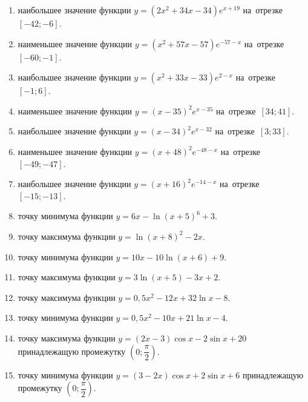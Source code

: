 \documentclass[a4paper,10pt]{article}
\begin{document}
\begin{enumerate}
\item {} наибольшее значение функции $y=\left(2x^2 +34x -34\right)e^{x+19}$ на~отрезке~$\left[-42;-6\right]$.

\item {} наименьшее значение функции $y=\left(x^2 +57x -57\right)e^{-57-x}$ на~отрезке~$\left[-60;-1\right]$.

\item {} наибольшее значение функции $y=\left(x^2 +33x -33\right)e^{2-x}$ на~отрезке~$\left[-1;6\right]$.

\item {} наименьшее значение функции $y=\left(x-35\right)^2e^{x-35}$ на~отрезке~$\left[34;41\right]$.

\item {} наибольшее значение функции $y=\left(x-34\right)^2e^{x-32}$ на~отрезке~$\left[3;33\right]$.

\item {} наименьшее значение функции $y=\left(x+48\right)^2e^{-48-x}$ на~отрезке~$\left[-49;-47\right]$.

\item {} наибольшее значение функции $y=\left(x+16\right)^2e^{-14-x}$ на~отрезке~$\left[-15;-13\right]$.

\item {} точку минимума функции $y=6x-\ln\left(x+5\right)^{6}+3$.

\item {} точку максимума функции $y=\ln\left(x+8\right)^{2}-2x$.

\item {} точку минимума функции $y=10x-10\ln\left(x+6\right)+9$.

\item {} точку максимума функции $y=3\ln\left(x+5\right)-3x+2$.

\item {} точку максимума функции $y=0,5x^2-12x+32\ln x -8$.

\item {} точку минимума функции $y=0,5x^2-10x+21\ln x -4$.

\item {} точку максимума функции $y=\left(2x-3\right)\cos x -2\sin x+20$
принадлежащую промежутку $\left(0;\dfrac{\pi}{2}\right)$.

\item {} точку минимума функции $y=\left(3-2x\right)\cos x +2\sin x+6$
принадлежащую промежутку $\left(0;\dfrac{\pi}{2}\right)$.


\end{enumerate}
\end{document}
